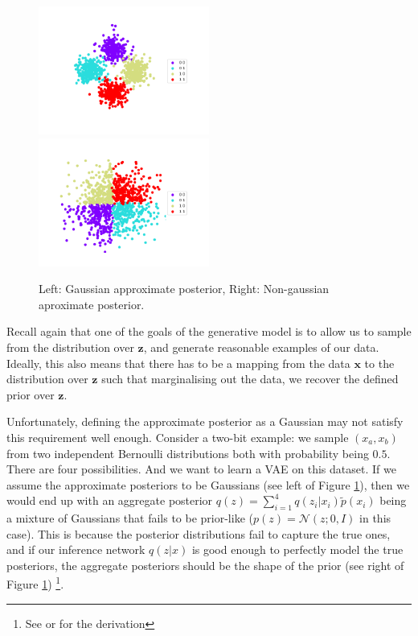 \documentclass{article}
\newcommand{\N}{\mathcal{N}}
\newcommand{\x}{\mathbf{x}}
\newcommand{\z}{\mathbf{z}}
\begin{document}
\begin{figure}
\includegraphics[width=0.5\textwidth]{figures/2bits_gaussian.png}
\includegraphics[width=0.5\textwidth]{figures/2bits_dsf.png}
\label{ref:gauss_vs_flow}
\caption{Left: Gaussian approximate posterior, Right: Non-gaussian aproximate posterior.}
\end{figure}

Recall again that one of the goals of the generative model is to allow us to sample from the distribution over $\z$, and generate reasonable examples of our data. Ideally, this also means that there has to be a mapping from the data $\x$ to the distribution over $\z$ such that marginalising out the data, we recover the defined prior over $\z$.

Unfortunately, defining the approximate posterior as a Gaussian may not satisfy this requirement well enough. 
Consider a two-bit example: we sample $(x_a,x_b)$ from two independent Bernoulli distributions both with probability being $0.5$.
There are four possibilities. 
And we want to learn a VAE on this dataset.
If we assume the approximate posteriors to be Gaussians (see left of Figure \ref{ref:gauss_vs_flow}), then we would end up with an aggregate posterior $q(z) = \sum_{i=1}^4 q(z_i|x_i)\tilde{p}(x_i)$ being a mixture of Gaussians that fails to be prior-like ($p(z)=\N(z;0,I)$ in this case). 
This is because the posterior distributions fail to capture the true ones, and if our inference network $q(z|x)$ is good enough to perfectly model the true posteriors, the aggregate posteriors should be the shape of the prior (see right of Figure \ref{ref:gauss_vs_flow}) \footnote{See \cite{hoffman2016elbo} or \cite{huang2017led} for the derivation}.
\end{document}
